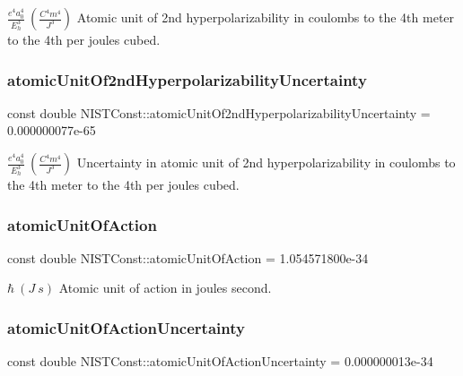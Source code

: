 $\frac{e^4 a_0^4}{E_h^3} \ (\frac{C^4 m^4}{J^3})$ Atomic unit of 2nd hyperpolarizability in coulombs to the 4th meter to the 4th per joules cubed. \mbox{\label{group___atomic_unit_ga0977fcc84fb0f3d50f77493053fba633}} 
\subsubsection{\texorpdfstring{atomic\+Unit\+Of2nd\+Hyperpolarizability\+Uncertainty}{atomicUnitOf2ndHyperpolarizabilityUncertainty}}
{\footnotesize\ttfamily const double N\+I\+S\+T\+Const\+::atomic\+Unit\+Of2nd\+Hyperpolarizability\+Uncertainty = 0.\+000000077e-\/65}

$\frac{e^4 a_0^4}{E_h^3} \ (\frac{C^4 m^4}{J^3})$ Uncertainty in atomic unit of 2nd hyperpolarizability in coulombs to the 4th meter to the 4th per joules cubed. \mbox{\label{group___atomic_unit_ga6685e215d87395646fc18e2efa30d7a0}} 
\subsubsection{\texorpdfstring{atomic\+Unit\+Of\+Action}{atomicUnitOfAction}}
{\footnotesize\ttfamily const double N\+I\+S\+T\+Const\+::atomic\+Unit\+Of\+Action = 1.\+054571800e-\/34}

$\hbar \ (J\ s)$ Atomic unit of action in joules second. \mbox{\label{group___atomic_unit_ga23528f5eb51ef25537027bf44e12663c}} 
\subsubsection{\texorpdfstring{atomic\+Unit\+Of\+Action\+Uncertainty}{atomicUnitOfActionUncertainty}}
{\footnotesize\ttfamily const double N\+I\+S\+T\+Const\+::atomic\+Unit\+Of\+Action\+Uncertainty = 0.\+000000013e-\/34}

